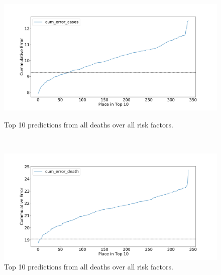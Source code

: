 \documentclass[12pt]{article}
\theoremstyle{definition}
\renewcommand{\_}{%
    \textunderscore\hspace{0pt}%
}
\begin{document}
\begin{figure}[!p]
\begin{minipage}{.45\textwidth}
        \centering
        \includegraphics[width=1.0\textwidth]{images/predict/PlaceTop10_Cases.pdf}
        \vspace{-1cm}
        \caption{Top 10 predictions from all deaths  over all risk factors.}
        \label{fig:place-top10-cases}
    \end{minipage}
    \ \
    \begin{minipage}{.45\textwidth}
        
        \centering
        \includegraphics[width=1.0\textwidth]{images/predict/PlaceTop10_Death.pdf}
        \vspace{-1cm}
        \caption{Top 10 predictions from all deaths over all risk factors.}
        \label{fig:place-top10-death}
    \end{minipage}
\end{figure}
\end{document}
